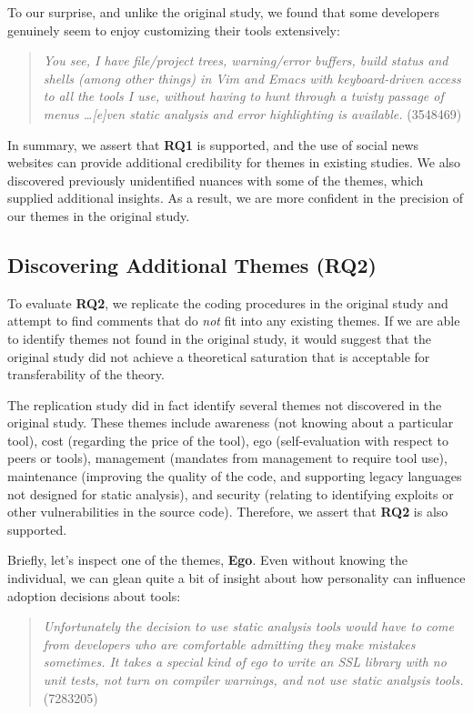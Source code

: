 \documentclass{sig-alternate}
\begin{document}
To our surprise, and unlike the original study, we found that some developers genuinely seem to enjoy customizing their tools extensively:

\begin{quote}
\textit{You see, I have file/project trees, warning/error buffers, build status and shells (among other things) in Vim and Emacs with keyboard-driven access to all the tools I use, without having to hunt through a twisty passage of menus \ldots [e]ven static analysis and error highlighting is available.} (3548469)
\end{quote}

In summary, we assert that \textbf{RQ1} is supported, and the use of social news websites can provide additional credibility for themes in existing studies. We also discovered previously unidentified nuances with some of the themes, which supplied additional insights. As a result, we are more confident in the precision of our themes in the original study.

\subsection{Discovering Additional Themes (RQ2)}

To evaluate \textbf{RQ2}, we replicate the coding procedures in the original study and attempt to find comments that do \textit{not} fit into any existing themes. If we are able to identify themes not found in the original study, it would suggest that the original study did not achieve a theoretical saturation that is acceptable for transferability of the theory.

The replication study did in fact identify several themes not discovered in the original study. These themes include awareness (not knowing about a particular tool), cost (regarding the price of the tool), ego (self-evaluation with respect to peers or tools), management (mandates from management to require tool use), maintenance (improving the quality of the code, and supporting legacy languages not designed for static analysis), and security (relating to identifying exploits or other vulnerabilities in the source code). Therefore, we assert that \textbf{RQ2} is also supported.

Briefly, let's inspect one of the themes, \textbf{Ego}. Even without knowing the individual, we can glean quite a bit of insight about how personality can influence adoption decisions about tools:

\begin{quote}
\textit{Unfortunately the decision to use static analysis tools would have to come from developers who are comfortable admitting they make mistakes sometimes. It takes a special kind of ego to write an SSL library with no unit tests, not turn on compiler warnings, and not use static analysis tools.} (7283205)
\end{quote}
\end{document}
